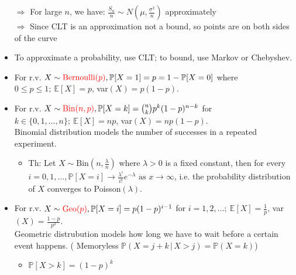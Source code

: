 \documentclass{article}
\begin{document}
\begin{itemize}
	$\Longrightarrow$ For large $n$, we have: $\frac{S_n}{n} \sim N(\mu, \frac{\sigma^2}{n})$ approximately \\
	$\Longrightarrow$ Since CLT is an {\color{red} approximation} not a bound, so points are on both sides of the curve

	\item To approximate a probability, use CLT; to bound, use Markov or Chebyshev.

\end{itemize}



{\color{blue} }
\begin{itemize}
	\item For r.v. $X\sim {\color{red} \text{Bernoulli}(p)}, \mathbb{P}[X=1] = p = 1 - \mathbb{P}[X=0]$ where $0\leq p\leq1;\ \mathbb{E}[X] = p$, var$(X) = p(1-p)$.
	
	\item For r.v. $X\sim {\color{red} \text{Bin}(n, p)}, \mathbb{P}[X=k] = \binom{n}{k} p^k (1-p)^{n-k}$ for $k\in\{0,1,\dots, n\};\
	\mathbb{E}[X] = np$, var$(X) = np(1-p)$. \\
	Binomial distribution models the number of successes in a repeated experiment.
	\begin{itemize}
		\item Th: Let $X\sim \text{Bin}(n,\frac{\lambda}{n})$ where $\lambda > 0$ is a fixed constant, then for every $i = 0,1,\dots, \mathbb{P}[X=i] \longrightarrow \frac{\lambda^i}{i!}e^{-\lambda} \text{ as } x\longrightarrow \infty$, i.e. the probability distribution of $X$ converges to Poisson$(\lambda)$.
	\end{itemize}

	\item For r.v. $X\sim {\color{red} \text{Geo}(p)}, \mathbb{P}[X=i] = p (1-p)^{i-1}$ for $i = 1,2,\dots;\
	\mathbb{E}[X] = \frac{1}{p}$, var$(X) = \frac{1-p}{p^2}$. \\
	Geometric distrubution models how long we have to wait before a certain event happens. ({\color{red} Memoryless} $\mathbb{P}(X=j+k\,|\,X>j) = \mathbb{P}(X=k)$)
	\begin{itemize}
		\item $\mathbb{P}[X > k] = (1-p)^k$
	\end{itemize}


\end{itemize}
\end{document}
